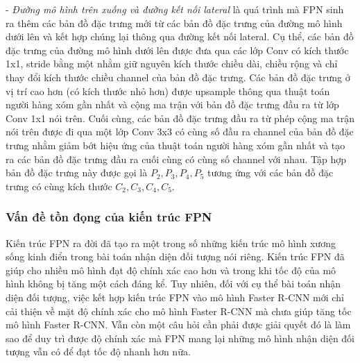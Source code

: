 {    \noindent
    - \textit{Đường mô hình trên xuống và đường kết nối lateral} là quá trình mà FPN sinh ra thêm các bản đồ đặc trưng mới từ các bản đồ đặc trưng của đường mô hình dưới lên và kết hợp chúng lại thông qua đường kết nối lateral.
    Cụ thể, các bản đồ đặc trưng của đường mô hình dưới lên được đưa qua các lớp Conv có kích thước 1x1, stride bằng một nhằm giữ nguyên kích thước chiều dài, chiều rộng và chỉ thay đổi kích thước chiều channel của bản đồ đặc trưng.
    Các bản đồ đặc trưng ở vị trí cao hơn (có kích thước nhỏ hơn) được upsample thông qua thuật toán người hàng xóm gần nhất và cộng ma trận với bản đồ đặc trưng đầu ra từ lớp Conv 1x1 nói trên.
    Cuối cùng, các bản đồ đặc trưng đầu ra từ phép cộng ma trận nói trên được đi qua một lớp Conv 3x3 có cùng số đầu ra channel của bản đồ đặc trưng nhằm giảm bớt hiệu ứng của thuật toán người hàng xóm gần nhất và tạo ra các bản đồ đặc trưng đầu ra cuối cùng có cùng số channel với nhau.
    Tập hợp bản đồ đặc trưng này được gọi là \textit{{${P}_{2}, {P}_{3}, {P}_{4}, {P}_{5}$}} tương ứng với các bản đồ đặc trưng có cùng kích thước \textit{{${C}_{2}, {C}_{3}, {C}_{4}, {C}_{5}$}}.

    \subsubsection*{Vấn đề tồn đọng của kiến trúc FPN}
    Kiến trúc FPN ra đời đã tạo ra một trong số những kiến trúc mô hình xương sống kinh điển trong bài toán nhận diện đối tượng nói riêng.
    Kiến trúc FPN đã giúp cho nhiều mô hình đạt độ chính xác cao hơn và trong khi tốc độ của mô hình không bị tăng một cách đáng kể.
    Tuy nhiên, đối với cụ thể bài toán nhận diện đối tượng, việc kết hợp kiến trúc FPN vào mô hình Faster R-CNN mới chỉ cải thiện về mặt độ chính xác cho mô hình Faster R-CNN mà chưa giúp tăng tốc mô hình Faster R-CNN.
    Vẫn còn một câu hỏi cần phải được giải quyết đó là làm sao để duy trì được độ chính xác mà FPN mang lại những mô hình nhận diện đối tượng vẫn có để đạt tốc độ nhanh hơn nữa.
}